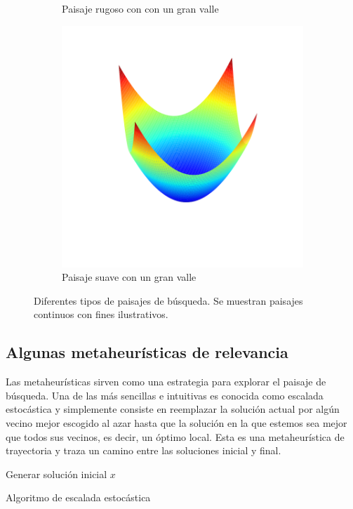 \begin{figure}[H]
\begin{subfigure}{.5\textwidth}
    \caption{Paisaje rugoso con con un gran valle}
\end{subfigure}
\begin{subfigure}{\textwidth}
    \centering
    \includegraphics[scale=.4]{Imagenes/smoothvalley.png}
    \caption{Paisaje suave con un gran valle}
\end{subfigure}
\caption{Diferentes tipos de paisajes de búsqueda. Se muestran paisajes continuos con fines ilustrativos.}
    \label{fig:landtypes}
\end{figure}

\subsection*{Algunas metaheurísticas de relevancia}
Las metaheurísticas sirven como una estrategia para explorar el paisaje de búsqueda. 
%
Una de las más sencillas e intuitivas es conocida como escalada estocástica y simplemente consiste en reemplazar la solución actual por algún vecino mejor 
escogido al azar hasta que la solución en la que estemos sea mejor que todos sus vecinos, es decir, un óptimo local. 
%
Esta es una metaheurística de trayectoria y traza un camino entre las soluciones inicial y final.

%
\begin{algorithm}[H]
 Generar solución inicial $x$\;
    \label{alg:LS}
    \caption{Algoritmo de escalada estocástica}
\end{algorithm}

